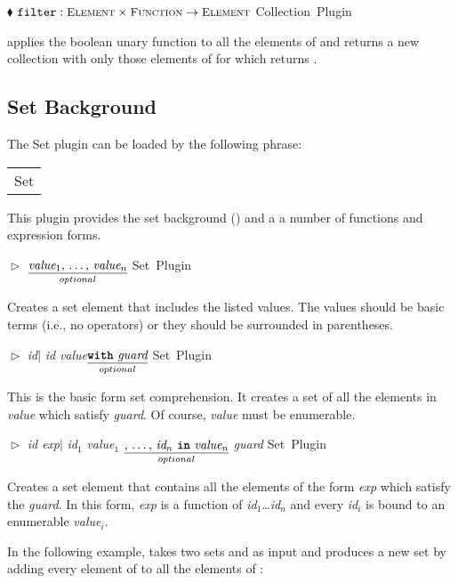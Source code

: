 \documentclass{article}
\newcommand{\codebf}[1]{\xspace{\bf \code{#1}}\xspace}
\newcommand{\keyword}[1]{\codebf{#1}}
\newcommand{\funcform}[2]{\pform{$\blacklozenge$}{#1}{#2}}
\newcommand{\opform}[2]{\pform{$\vartriangleright$}{#1}{#2}}
\newcommand{\pform}[3]{\vspace*{4mm} \noindent #1 #2 \vspace{1mm}\textcolor[gray]{0.7}{\dotfill}\mbox{{\sffamily \footnotesize #3}}}
\newcommand{\bExample}{\begin{small} \vspace{0.3cm} \begin{tabular}{|l} \begin{minipage}{0.85\textwidth} \vspace{0.2cm} \ttfamily}
\newcommand{\eExample}{\vspace{0.2cm} \end{minipage} \end{tabular} \vspace{0.3cm} \end{small}}
\newcommand{\optional}[1]{$\underset{optional}{\underline{\mbox{#1}}}$}
\renewcommand{\id}{{\em id}\xspace}
\newcommand{\val}{{\em value}\xspace}
\newcommand{\guard}{{\em guard}\xspace}
\newcommand{\idi}[1]{{\em id}$_{#1}$\xspace}
\newcommand{\valuei}[1]{{\em value}$_{#1}$\xspace}
\begin{document}
\funcform{$\mbox{{\ttfamily filter}} : \mbox{\scshape\small Element} \times \mbox{\scshape\small Function} \rightarrow \mbox{\scshape\small Element}$}{Collection Plugin}

 applies the boolean unary function  to all the elements of  and returns a new collection with only those elements of  for which  returns . 


\subsection{Set Background}
\label{set}

The Set plugin can be loaded by the following \keyword{use} phrase:

\bExample
	\codebf{use} Set
\eExample

\noindent This plugin provides the set background () and
a a number of functions and expression forms. 

\opform{\code{\{} \optional{\valuei{1}, \ldots, \valuei{n}} \code{\}}}{Set Plugin}

Creates a set element that includes the listed values. The values should be basic terms (i.e., no operators) or
they should be surrounded in parentheses.

\opform{\code{\{} \id $|$ \id \codebf{in} \val \optional{\codebf{with} \guard} \code{\}}}{Set Plugin}

This is the basic form set comprehension. It creates a set of all the elements in \val
which satisfy \guard. Of course, \val must be enumerable.

\opform{\code{\{} \id \codebf{is} {\em exp}\xspace $|$ \idi{1} \codebf{in} \valuei{1} 
		\optional{, \ldots, \idi{n} \codebf{in} \valuei{n}} \codebf{with} \guard \code{\}}}{Set Plugin}

Creates a set element that contains all the elements of the form {\em exp} which
satisfy the \guard. In this form, {\em exp} is a function of \idi{1}\ldots \idi{n} and 
every \idi{i} is bound to an enumerable \valuei{i}. 

In the following example,  takes two sets  and  as input and produces a new set
by adding every element of  to all the elements of :   
\end{document}
